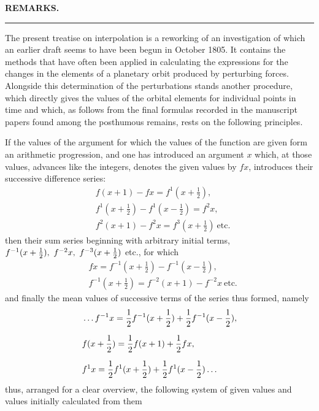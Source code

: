 \begingroup
\renewcommand{\arraystretch}{1.45}
\clearpage{}
\begin{center}\textbf{REMARKS.}\end{center}
\begin{center}\rule{3em}{0.3pt}\end{center}

The present treatise on interpolation is a reworking of an investigation of which an earlier draft seems to have been begun in October 1805. It contains the methods that have often been applied in calculating the expressions for the changes in the elements of a planetary orbit produced by perturbing forces. Alongside this determination of the perturbations stands another procedure, which directly gives the values of the orbital elements for individual points in time and which, as follows from the final formulas recorded in the manuscript papers found among the posthumous remains, rests on the following principles.

If the values of the argument for which the values of the function are given form an arithmetic progression, and one has introduced an argument $x$ which, at those values, advances like the integers, denotes the given values by $fx$, introduces their successive difference series:
\[
\begin{aligned}
&f(x+1)-fx=f^{1}(x+\frac12),\\[6pt]
&f^{1}(x+\frac12)-f^{1}(x-\frac12)=f^{2}x,\\[6pt]
&f^{2}(x+1)-f^{2}x=f^{3}(x+\frac12)\ \mbox{etc.}
\end{aligned}
\]
then their sum series beginning with arbitrary initial terms,
\hfill\break{}
$f^{-1}(x+\nobreak{}\tfrac12),\allowbreak{}\ f^{-2}x,\allowbreak{}\ f^{-3}(x+\nobreak{}\tfrac12)$ etc.,
for which
\[
\begin{aligned}
&fx=f^{-1}(x+\frac12)-f^{-1}(x-\frac12),\\[6pt]
&f^{-1}(x+\frac12)=f^{-2}(x+1)-f^{-2}x\ \mbox{etc.}
\end{aligned}
\]
and finally the mean values of successive terms of the series thus formed, namely
\[
\begin{aligned}
&\mathinner{.\,.\,.} f^{-1}x=\frac12f^{-1}(x+\frac12)+\frac12f^{-1}(x-\frac12),\\[6pt]
&f(x+\frac12)=\frac12f(x+1)+\frac12fx,\\[6pt]
&f^{1}x=\frac12f^{1}(x+\frac12)+\frac12f^{1}(x-\frac12)\mathinner{.\,.\,.}
\end{aligned}
\]
thus, arranged for a clear overview, the following system of given values and values initially calculated from them

